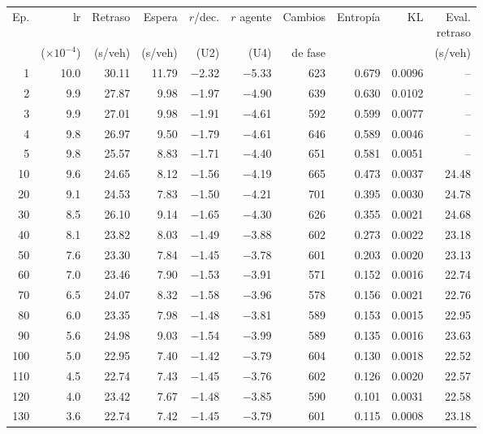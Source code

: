 \begin{table}[H]
\centering
\scriptsize
\setlength{\tabcolsep}{3pt}
\setlength{\tabcolsep}{2pt}
\begin{tabular}{rrrrrrrrrr}
\toprule
Ep. & lr & Retraso & Espera & $r$/dec. & $r$ agente & Cambios & Entropía & KL & \makecell{Eval.\\retraso} \\
 & ($\times 10^{-4}$) & (s/veh) & (s/veh) & (U2) & (U4) & de fase &  &  & (s/veh) \\
\midrule
1 & 10.0 & 30.11 & 11.79 & $-$2.32 & $-$5.33 & 623 & 0.679 & 0.0096 & -- \\
2 & 9.9 & 27.87 & 9.98 & $-$1.97 & $-$4.90 & 639 & 0.630 & 0.0102 & -- \\
3 & 9.9 & 27.01 & 9.98 & $-$1.91 & $-$4.61 & 592 & 0.599 & 0.0077 & -- \\
4 & 9.8 & 26.97 & 9.50 & $-$1.79 & $-$4.61 & 646 & 0.589 & 0.0046 & -- \\
5 & 9.8 & 25.57 & 8.83 & $-$1.71 & $-$4.40 & 651 & 0.581 & 0.0051 & -- \\
10 & 9.6 & 24.65 & 8.12 & $-$1.56 & $-$4.19 & 665 & 0.473 & 0.0037 & 24.48 \\
20 & 9.1 & 24.53 & 7.83 & $-$1.50 & $-$4.21 & 701 & 0.395 & 0.0030 & 24.78 \\
30 & 8.5 & 26.10 & 9.14 & $-$1.65 & $-$4.30 & 626 & 0.355 & 0.0021 & 24.68 \\
40 & 8.1 & 23.82 & 8.03 & $-$1.49 & $-$3.88 & 602 & 0.273 & 0.0022 & 23.18 \\
50 & 7.6 & 23.30 & 7.84 & $-$1.45 & $-$3.78 & 601 & 0.203 & 0.0020 & 23.13 \\
60 & 7.0 & 23.46 & 7.90 & $-$1.53 & $-$3.91 & 571 & 0.152 & 0.0016 & 22.74 \\
70 & 6.5 & 24.07 & 8.32 & $-$1.58 & $-$3.96 & 578 & 0.156 & 0.0021 & 22.76 \\
80 & 6.0 & 23.35 & 7.98 & $-$1.48 & $-$3.81 & 589 & 0.153 & 0.0015 & 22.95 \\
90 & 5.6 & 24.98 & 9.03 & $-$1.54 & $-$3.99 & 589 & 0.135 & 0.0016 & 23.63 \\
100 & 5.0 & 22.95 & 7.40 & $-$1.42 & $-$3.79 & 604 & 0.130 & 0.0018 & 22.52 \\
110 & 4.5 & 22.74 & 7.43 & $-$1.45 & $-$3.76 & 602 & 0.126 & 0.0020 & 22.57 \\
120 & 4.0 & 23.42 & 7.67 & $-$1.48 & $-$3.85 & 590 & 0.101 & 0.0031 & 22.58 \\
130 & 3.6 & 22.74 & 7.42 & $-$1.45 & $-$3.79 & 601 & 0.115 & 0.0008 & 23.18 \\

\end{tabular}
\end{table}
